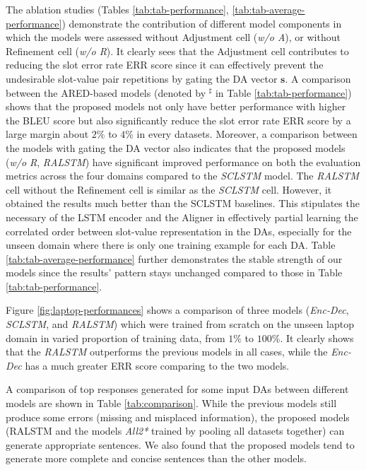 \documentclass[11pt,a4paper]{article}
\begin{document}
The ablation studies (Tables \ref{tab:tab-performance}, \ref{tab:tab-average-performance}) demonstrate the contribution of different model components in which the models were assessed without Adjustment cell (\textit{w/o A}), or without Refinement cell (\textit{w/o R}). It clearly sees that the Adjustment cell contributes to reducing the slot error rate ERR score since it can effectively prevent the undesirable slot-value pair repetitions by gating the DA vector $\textbf{s}$. A comparison between the ARED-based models (denoted by $^{\sharp}$ in Table \ref{tab:tab-performance}) shows that the proposed models not only have better performance with higher the BLEU score but also significantly reduce the slot error rate ERR score by a large margin about $2\%$ to $4\%$ in every datasets. Moreover, a comparison between the models with gating the DA vector also indicates that the proposed models (\textit{w/o R}, \textit{RALSTM}) have significant improved performance on both the evaluation metrics across the four domains compared to the \textit{SCLSTM} model. The \textit{RALSTM} cell without the Refinement cell is similar as the \textit{SCLSTM} cell. However, it obtained the results much better than the SCLSTM baselines. This stipulates the necessary of the LSTM encoder and the Aligner in effectively partial learning the correlated order between slot-value representation in the DAs, especially for the unseen domain where there is only one training example for each DA.
Table \ref{tab:tab-average-performance} further demonstrates the stable strength of our models since the results' pattern stays unchanged compared to those in Table \ref{tab:tab-performance}. 

Figure \ref{fig:laptop-performances} shows a comparison of three models (\textit{Enc-Dec}, \textit{SCLSTM}, and \textit{RALSTM}) which were trained from scratch on the unseen laptop domain in varied proportion of training data, from $1\%$ to $100\%$. It clearly shows that the \textit{RALSTM} outperforms the previous models in all cases, while the \textit{Enc-Dec} has a much greater ERR score comparing to the two models. 

A comparison of top responses generated for some input DAs between different models are shown in Table \ref{tab:comparison}. While the previous models still produce some errors (missing and misplaced information), the proposed models (RALSTM and the models \textit{All2*} trained by pooling all datasets together) can generate appropriate sentences. We also found that the proposed models tend to generate more complete and concise sentences than the other models. 
\end{document}
